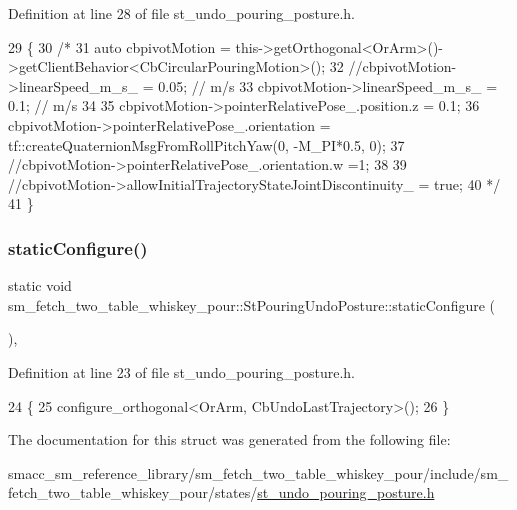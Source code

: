 Definition at line 28 of file st\+\_\+undo\+\_\+pouring\+\_\+posture.\+h.


\begin{DoxyCode}
29         \{
30             \textcolor{comment}{/*}
31 \textcolor{comment}{            auto cbpivotMotion =
       this->getOrthogonal<OrArm>()->getClientBehavior<CbCircularPouringMotion>();}
32 \textcolor{comment}{            //cbpivotMotion->linearSpeed\_m\_s\_ = 0.05; // m/s}
33 \textcolor{comment}{            cbpivotMotion->linearSpeed\_m\_s\_ = 0.1; // m/s}
34 \textcolor{comment}{}
35 \textcolor{comment}{            cbpivotMotion->pointerRelativePose\_.position.z = 0.1;}
36 \textcolor{comment}{            cbpivotMotion->pointerRelativePose\_.orientation = tf::createQuaternionMsgFromRollPitchYaw(0,
       -M\_PI*0.5, 0);}
37 \textcolor{comment}{            //cbpivotMotion->pointerRelativePose\_.orientation.w =1;}
38 \textcolor{comment}{}
39 \textcolor{comment}{            //cbpivotMotion->allowInitialTrajectoryStateJointDiscontinuity\_ = true;}
40 \textcolor{comment}{            */}
41         \}
\end{DoxyCode}
\mbox{\label{structsm__fetch__two__table__whiskey__pour_1_1StPouringUndoPosture_a9824b7226fb82ff7c1f36cefa5bff905}} 
\subsubsection{\texorpdfstring{static\+Configure()}{staticConfigure()}}
{\footnotesize\ttfamily static void sm\+\_\+fetch\+\_\+two\+\_\+table\+\_\+whiskey\+\_\+pour\+::\+St\+Pouring\+Undo\+Posture\+::static\+Configure (\begin{DoxyParamCaption}{ }\end{DoxyParamCaption})\hspace{0.3cm}{\ttfamily [inline]}, {\ttfamily [static]}}



Definition at line 23 of file st\+\_\+undo\+\_\+pouring\+\_\+posture.\+h.


\begin{DoxyCode}
24         \{
25             configure\_orthogonal<OrArm, CbUndoLastTrajectory>();
26         \}
\end{DoxyCode}


The documentation for this struct was generated from the following file\+:\begin{DoxyCompactItemize}
\item 
smacc\+\_\+sm\+\_\+reference\+\_\+library/sm\+\_\+fetch\+\_\+two\+\_\+table\+\_\+whiskey\+\_\+pour/include/sm\+\_\+fetch\+\_\+two\+\_\+table\+\_\+whiskey\+\_\+pour/states/\hyperlink{st__undo__pouring__posture_8h}{st\+\_\+undo\+\_\+pouring\+\_\+posture.\+h}\end{DoxyCompactItemize}
